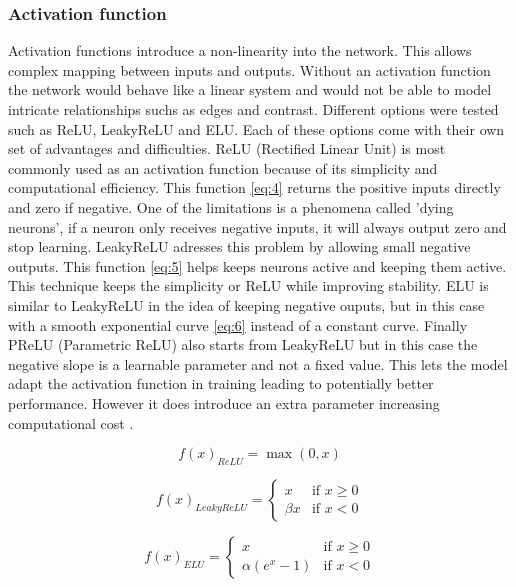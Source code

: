 \documentclass[twocolumn]{article}
\begin{document}
\subsubsection{Activation function}
Activation functions introduce a non-linearity into the network. This allows complex mapping between inputs and outputs. Without an activation function the network would behave like a linear system and would not be able to model intricate relationships suchs as edges and contrast. Different options were tested such as ReLU,  LeakyReLU and ELU. Each of these options come with their own set of advantages and difficulties. ReLU (Rectified Linear Unit) is most commonly used as an activation function because of its simplicity and computational efficiency. This function \ref{eq:4} returns the positive inputs directly and zero if negative. One of the limitations is a phenomena called 'dying neurons',  if a neuron only receives negative inputs, it will always output zero and stop learning.
LeakyReLU adresses this problem by allowing small negative outputs. This function \ref{eq:5} helps keeps neurons active and keeping them active. This technique keeps the simplicity or ReLU while improving stability. 
ELU is similar to LeakyReLU in the idea of keeping negative ouputs, but in this case with a smooth exponential curve \ref{eq:6}  instead of a constant curve. Finally PReLU (Parametric ReLU) also starts from LeakyReLU but in this case the negative slope is a learnable parameter and not a fixed value. This lets the model adapt the activation function in training leading to potentially better performance. However it does introduce an extra parameter increasing computational cost \cite{bharatiya_2019_comprehensive}.

\begin{equation}\label{eq:4}
    f(x)_{ReLU} = \max(0, x)
\end{equation}

\begin{equation}\label{eq:5}
f(x)_{LeakyReLU} = 
\begin{cases}
x & \text{if } x \geq 0 \\
\beta x & \text{if } x < 0
\end{cases}
\end{equation}

\begin{equation}\label{eq:6}
f(x)_{ELU} = 
\begin{cases}
x & \text{if } x \geq 0 \\
\alpha (e^x - 1) & \text{if } x < 0
\end{cases}
\end{equation}
\end{document}
